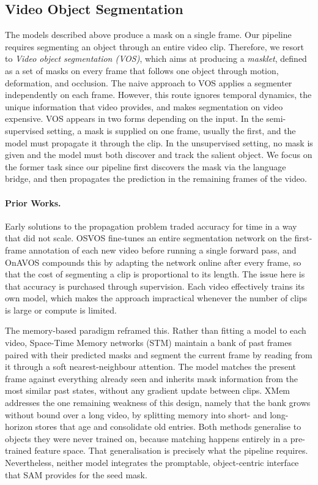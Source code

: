 \subsection{Video Object Segmentation}
\label{sec:addition-of-time}

The models described above produce a mask on a single frame. Our pipeline requires segmenting an object through an entire video clip. Therefore, we resort to \textit{Video object segmentation (VOS)}, which aims at producing a \textit{masklet}, defined as a set of masks on every frame that follows one object through motion, deformation, and occlusion. The naive approach to VOS applies a segmenter independently on each frame. However, this route ignores temporal dynamics, the unique information that video provides, and makes segmentation on video expensive. VOS appears in two forms depending on the input. In the semi-supervised setting, a mask is supplied on one frame, usually the first, and the model must propagate it through the clip. In the unsupervised setting, no mask is given and the model must both discover and track the salient object. We focus on the former task since our pipeline first discovers the mask via the language bridge, and then propagates the prediction in the remaining frames of the video.

\paragraph{Prior Works.} Early solutions to the propagation problem traded accuracy for time in a way that did not scale. OSVOS \cite{caelles2017osvos} fine-tunes an entire segmentation network on the first-frame
annotation of each new video before running a single forward pass, and OnAVOS compounds this by adapting the network online after every frame, so that the cost of segmenting a clip is
proportional to its length. The issue here is that accuracy is purchased through supervision. Each video effectively trains its own model, which makes the approach impractical
whenever the number of clips is large or compute is limited.

The memory-based paradigm reframed this. Rather than fitting a model to each video, Space-Time Memory networks (STM) \cite{oh2019stm} maintain a bank of past frames paired with their
predicted masks and segment the current frame by reading from it through a soft nearest-neighbour attention. The model matches the present frame against everything already seen and inherits
mask information from the most similar past states, without any gradient update between clips. XMem \cite{cheng2022xmem} addresses the one remaining weakness of this design, namely that
the bank grows without bound over a long video, by splitting memory into short- and long-horizon stores that age and consolidate old entries. Both methods generalise to objects they were
never trained on, because matching happens entirely in a pre-trained feature space. That generalisation is precisely what the pipeline requires. Nevertheless, neither model integrates the promptable,
object-centric interface that SAM provides for the seed mask.

